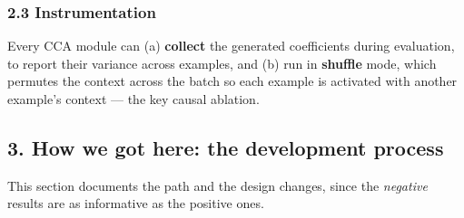 \documentclass[
  11pt,
]{article}
\begin{document}
\subsubsection{2.3 Instrumentation}\label{instrumentation}

Every CCA module can (a) \textbf{collect} the generated coefficients
during evaluation, to report their variance across examples, and (b) run
in \textbf{shuffle} mode, which permutes the context across the batch so
each example is activated with another example's context --- the key
causal ablation.

\subsection{3. How we got here: the development
process}\label{how-we-got-here-the-development-process}

This section documents the path and the design changes, since the
\emph{negative} results are as informative as the positive ones.
\end{document}
